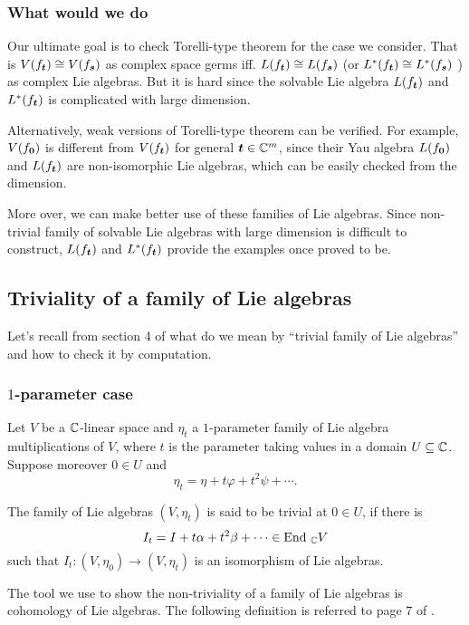   \subsubsection{What would we do}
  Our ultimate goal is to check Torelli-type theorem for the case we consider. That is $V(f_{{\boldsymbol t}})\cong V(f_{\boldsymbol s})$ as complex space germs iff. $L(f_{{\boldsymbol t}})\cong L(f_{\boldsymbol s})$ (or $L^*(f_{{\boldsymbol t}})\cong L^*(f_{\boldsymbol s})$ ) as complex Lie algebras. But it is hard since the solvable Lie algebra $L(f_{{\boldsymbol t}})$ and $L^*(f_{{\boldsymbol t}})$ is complicated with large dimension.

  Alternatively, weak versions of Torelli-type theorem can be verified. For example, $V(f_{{\boldsymbol 0}})$ is different from $V(f_{{\boldsymbol t}})$ for general ${\boldsymbol t}\in {\mathbb{C}}^m$, since their Yau algebra $L(f_{\boldsymbol 0})$ and $L(f_{\boldsymbol t})$ are non-isomorphic Lie algebras, which can be easily checked from the dimension.

  More over, we can make better use of these families of Lie algebras. Since non-trivial family of solvable Lie algebras with large dimension is difficult to construct, $L(f_{\boldsymbol t})$ and $L^*(f_{\boldsymbol t})$ provide the examples once proved to be.

  \subsection{Triviality of a family of Lie algebras}\label{sec-3.4}
  Let's recall from section 4 of \cite{BN} what do we mean by ``trivial family of Lie algebras'' and  how to check it by computation.
  \subsubsection{\texorpdfstring{$1$}{1}-parameter case}
  Let $V$ be a ${\mathbb{C}}$-linear space and $\eta_t$ a $1$-parameter family of Lie algebra multiplications of $V$, where $t$ is the parameter taking values in a domain $U \subseteq {\mathbb{C}}$.  Suppose moreover $0\in U$ and 
  \[\eta_t=\eta+t\varphi+t^2\psi+\cdots.\]

  \begin{definition}\label{din-3.2}
    The family of Lie algebras $\left(V, \eta_t\right)$ is said to be trivial at $0\in U$, if there is 
    \[I_t=I+t\alpha+t^2\beta+\cdots \in \operatorname{End}\,_{\mathbb{C}} V\]
    such that $I_t\colon(V,\eta_0) \to ( V,\eta_t)$ is an isomorphism of Lie algebras.
  \end{definition}
  The tool we use to show the non-triviality of a family of Lie algebras is cohomology of Lie algebras. The following definition is referred to page 7 of \cite{BN}. 

